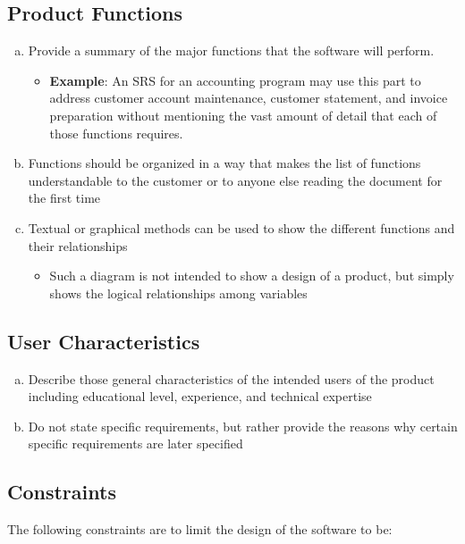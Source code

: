 \documentclass[titlepage]{article}
\begin{document}
\subsection{Product Functions}
\label{sub:product_functions}
\begin{enumerate}[a)]
	\item Provide a summary of the major functions that the software will perform.
	\begin{itemize}
		\item \textbf{Example}: An SRS for an accounting program may use this part to address customer account maintenance, customer statement, and invoice preparation without mentioning the vast amount of detail that each of those functions requires.
	\end{itemize}
	\item Functions should be organized in a way that makes the list of functions understandable to the customer or to anyone else reading the document for the first time
	\item Textual or graphical methods can be used to show the different functions and their relationships
	\begin{itemize}
		\item Such a diagram is not intended to show a design of a product, but simply shows the logical relationships among variables
	\end{itemize} 
\end{enumerate}

\subsection{User Characteristics}
\label{sub:user_characteristics}
\begin{enumerate}[a)]
	\item Describe those general characteristics of the intended users of the product including educational level, experience, and technical expertise
	\item Do not state specific requirements, but rather provide the reasons why certain specific requirements are later specified
\end{enumerate}


\subsection{Constraints}
\label{sub:constraints}
The following constraints are to limit the design of the software to be:
\end{document}
